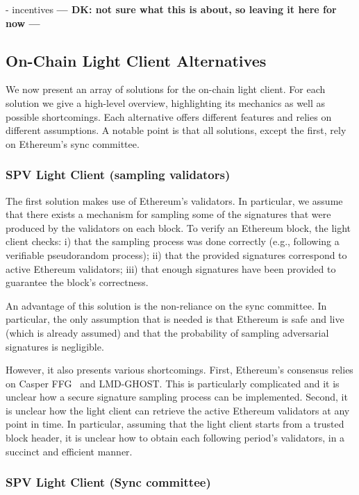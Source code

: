- incentives \textbf{--- DK: not sure what this is about, so leaving it here for now ---}

\subsection{On-Chain Light Client Alternatives}\label{subsec:alternatives}

We now present an array of solutions for the on-chain light client. For each
solution we give a high-level overview, highlighting its mechanics as well as
possible shortcomings. Each alternative offers different features and relies on
different assumptions. A notable point is that all solutions, except the first,
rely on Ethereum's sync committee.

\subsubsection{SPV Light Client (sampling validators)}

The first solution makes use of Ethereum's validators. In particular, we assume
that there exists a mechanism for sampling some of the signatures that were
produced by the validators on each block. To verify an Ethereum block, the
light client checks:
i) that the sampling process was done correctly (e.g., following a verifiable pseudorandom process);
ii) that the provided signatures correspond to active Ethereum validators;
iii) that enough signatures have been provided to guarantee the block's correctness. 

An advantage of this solution is the non-reliance on the sync committee. In
particular, the only assumption that is needed is that Ethereum is safe and
live (which is already assumed) and that the probability of sampling
adversarial signatures is negligible.

However, it also presents various shortcomings. 
First, Ethereum's consensus relies on Casper FFG~\cite{buterin2017casper} and
LMD-GHOST. This is particularly complicated and it is unclear how a secure
signature sampling process can be implemented.
Second, it is unclear how the light client can retrieve the active Ethereum
validators at any point in time. In particular, assuming that the light client
starts from a trusted block header, it is unclear how to obtain each following
period's validators, in a succinct and efficient manner.

\subsubsection{SPV Light Client (Sync committee)} 


